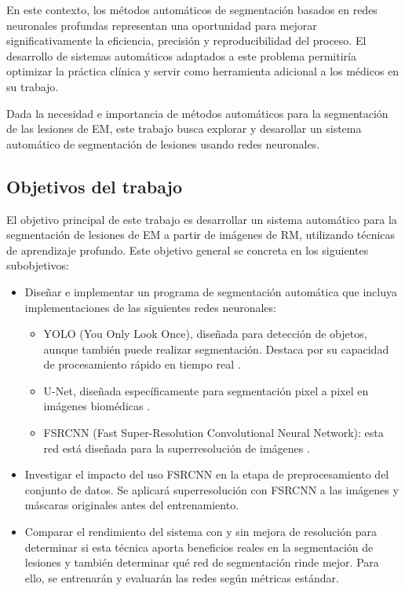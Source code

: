 \documentclass[../main.tex]{subfiles}
\begin{document}
En este contexto, los métodos automáticos de segmentación basados en redes neuronales profundas representan una oportunidad para mejorar significativamente la eficiencia, precisión y reproducibilidad del proceso. El desarrollo de sistemas automáticos adaptados a este problema permitiría optimizar la práctica clínica y servir como herramienta adicional a los médicos en su trabajo.

Dada la necesidad e importancia de métodos automáticos para la segmentación de las lesiones de EM, este trabajo busca explorar y desarollar un sistema automático de segmentación de lesiones usando redes neuronales. 

\subsection{Objetivos del trabajo}
El objetivo principal de este trabajo es desarrollar un sistema automático para la segmentación de lesiones de EM a partir de imágenes de RM, utilizando técnicas de aprendizaje profundo. Este objetivo general se concreta en los siguientes subobjetivos:

\begin{itemize}
    \item Diseñar e implementar un programa de segmentación automática que incluya implementaciones de las siguientes redes neuronales:
        \begin{itemize}
            \item YOLO (You Only Look Once), diseñada para detección de objetos, aunque también puede realizar segmentación. Destaca por su capacidad de procesamiento rápido en tiempo real \cite{yolo}.
            \item U-Net, diseñada específicamente para segmentación pixel a pixel en imágenes biomédicas \cite{unet}.
            \item FSRCNN (Fast Super-Resolution Convolutional Neural Network): esta red está diseñada para la superresolución de imágenes \cite{fsrcnn}.
        \end{itemize} 

    \item Investigar el impacto del uso FSRCNN en la etapa de preprocesamiento del conjunto de datos. Se aplicará superresolución con FSRCNN a las imágenes y máscaras originales antes del entrenamiento.

    \item Comparar el rendimiento del sistema con y sin mejora de resolución para determinar si esta técnica aporta beneficios reales en la segmentación de lesiones y también determinar qué red de segmentación rinde mejor. Para ello, se entrenarán y evaluarán las redes según métricas estándar.
    
\end{itemize}
\end{document}
